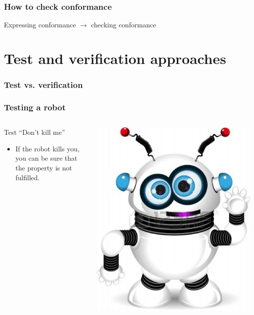 \documentclass{beamer}
\begin{document}
\begin{frame}
\frametitle{How to check conformance}

\Large{Expressing conformance $\xrightarrow{\ }$ checking conformance}

\end{frame}

\section{Test and verification approaches}
\begin{frame}
\frametitle{Test vs. verification}
\end{frame}

\begin{frame}
\frametitle{Testing a robot}

    \begin{columns}[c] %
    \begin{block}{Test \color{red}``Don't kill me''}
    \begin{itemize}
      \item If the robot kills you, you can be sure that the property is not fulfilled.
    \end{itemize}
    \end{block}
    \includegraphics[width=\textwidth]{../img/robot}
    \end{columns}
\end{frame}
\end{document}
